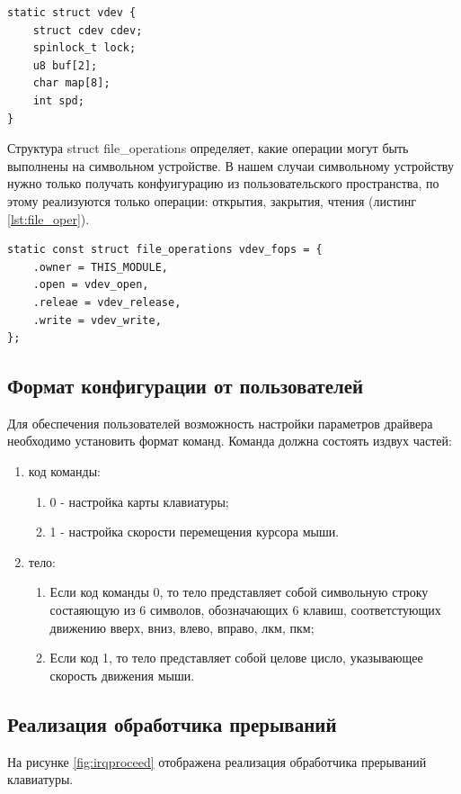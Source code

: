 \begin{lstlisting}[caption=Структура vdev, label={lst:vdev}]
static struct vdev {
	struct cdev cdev;
	spinlock_t lock;
	u8 buf[2];
	char map[8];
	int spd;
}
\end{lstlisting}

Структура struct file\_operations определяет, какие операции могут быть выполнены на символьном устройстве.
В нашем случаи символьному устройству нужно только получать конфуигурацию из пользовательского пространства, по этому реализуются только операции: открытия, закрытия, чтения (листинг \ref{lst:file_oper}).

\begin{lstlisting}[caption=Структура file\_operations, label=lst:file_oper]
static const struct file_operations vdev_fops = {
	.owner = THIS_MODULE,
	.open = vdev_open,
	.releae = vdev_release,
	.write = vdev_write,
};
\end{lstlisting}

\subsection{Формат конфигурации от пользователей}
Для обеспечения пользователей возможность настройки параметров драйвера необходимо установить формат команд. 
Команда должна состоять издвух частей:
\begin{enumerate}
	\item код команды: \begin{enumerate}
		\item 0 - настройка карты клавиатуры;
		\item 1 - настройка скорости перемещения курсора мыши.
	\end{enumerate}
	\item тело: \begin{enumerate}
		\item Если код команды 0, то тело представляет собой символьную строку состаяющую из 6 символов, обозначающих 6 клавиш, соответстующих движению вверх, вниз, влево, вправо, лкм, пкм;
		\item Если код 1, то тело представляет собой целове цисло, указывающее скорость движения мыши.
	\end{enumerate}
\end{enumerate}

\subsection{Реализация обработчика прерываний}
На рисунке \ref{fig:irqproceed} отображена реализация обработчика прерываний клавиатуры.

